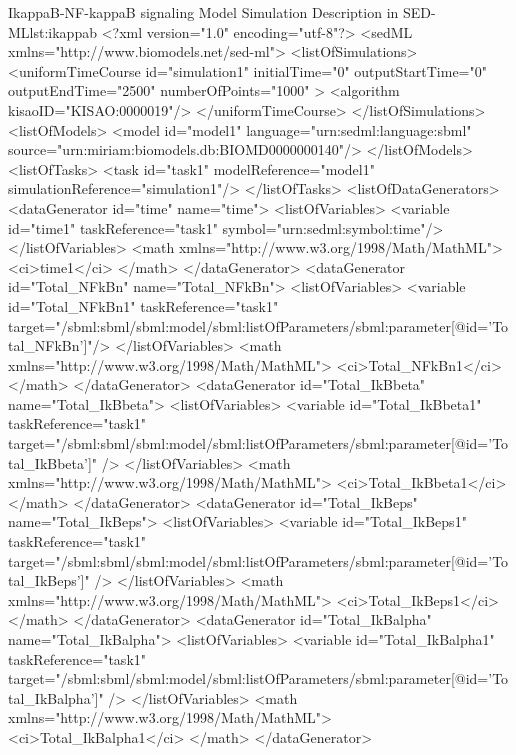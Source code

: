 \footnotesize
\begin{myXmlLst}{IkappaB-NF-kappaB signaling Model Simulation Description in SED-ML}{lst:ikappab}
<?xml version="1.0" encoding="utf-8"?>
<sedML xmlns="http://www.biomodels.net/sed-ml">
  <listOfSimulations>
    <uniformTimeCourse id="simulation1" 
    initialTime="0" outputStartTime="0" outputEndTime="2500"
    numberOfPoints="1000" >
      <algorithm kisaoID="KISAO:0000019"/>
    </uniformTimeCourse>
  </listOfSimulations>
  <listOfModels>
    <model id="model1" language="urn:sedml:language:sbml" source="urn:miriam:biomodels.db:BIOMD0000000140"/>
  </listOfModels>
  <listOfTasks>
    <task id="task1" modelReference="model1"
    simulationReference="simulation1"/>
  </listOfTasks>
  <listOfDataGenerators>
    <dataGenerator id="time" name="time">
      <listOfVariables>
        <variable id="time1" taskReference="task1" symbol="urn:sedml:symbol:time"/>
      </listOfVariables>
      <math xmlns="http://www.w3.org/1998/Math/MathML">
        <ci>time1</ci>
      </math>
    </dataGenerator>
    <dataGenerator id="Total_NFkBn" name="Total_NFkBn">
      <listOfVariables>
        <variable id="Total_NFkBn1" taskReference="task1"
        target="/sbml:sbml/sbml:model/sbml:listOfParameters/sbml:parameter[@id='Total_NFkBn']"/>
      </listOfVariables>
      <math xmlns="http://www.w3.org/1998/Math/MathML">
        <ci>Total_NFkBn1</ci>
      </math>
    </dataGenerator>
    <dataGenerator id="Total_IkBbeta" name="Total_IkBbeta">
      <listOfVariables>
        <variable id="Total_IkBbeta1" taskReference="task1"
        target="/sbml:sbml/sbml:model/sbml:listOfParameters/sbml:parameter[@id='Total_IkBbeta']" />
      </listOfVariables>
      <math xmlns="http://www.w3.org/1998/Math/MathML">
        <ci>Total_IkBbeta1</ci>
      </math>
    </dataGenerator>
    <dataGenerator id="Total_IkBeps" name="Total_IkBeps">
      <listOfVariables>
        <variable id="Total_IkBeps1" taskReference="task1"
        target="/sbml:sbml/sbml:model/sbml:listOfParameters/sbml:parameter[@id='Total_IkBeps']" />
      </listOfVariables>
      <math xmlns="http://www.w3.org/1998/Math/MathML">
        <ci>Total_IkBeps1</ci>
      </math>
    </dataGenerator>
    <dataGenerator id="Total_IkBalpha" name="Total_IkBalpha">
      <listOfVariables>
        <variable id="Total_IkBalpha1" taskReference="task1"
        target="/sbml:sbml/sbml:model/sbml:listOfParameters/sbml:parameter[@id='Total_IkBalpha']" />
      </listOfVariables>
      <math xmlns="http://www.w3.org/1998/Math/MathML">
        <ci>Total_IkBalpha1</ci>
      </math>
    </dataGenerator>

\end{myXmlLst}
